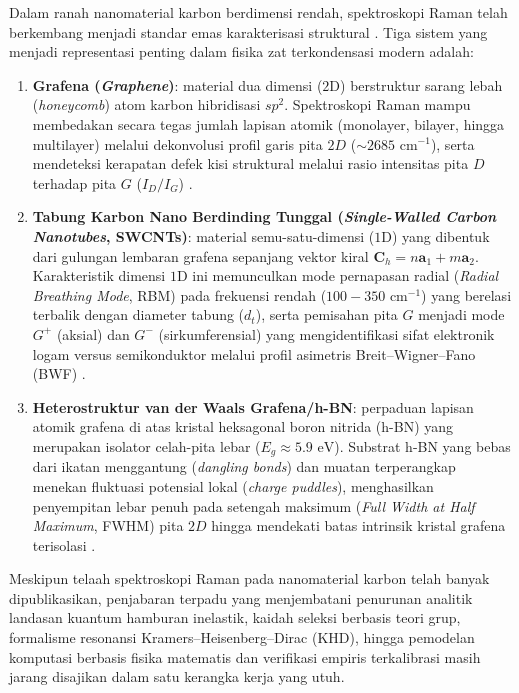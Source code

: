 Dalam ranah nanomaterial karbon berdimensi rendah, spektroskopi Raman telah berkembang menjadi standar emas karakterisasi struktural \cite{ferrari2006raman,dresselhaus2005raman,malard2009raman}. Tiga sistem yang menjadi representasi penting dalam fisika zat terkondensasi modern adalah:
\begin{enumerate}
    \item \textbf{Grafena (\textit{Graphene})}: material dua dimensi ($2\text{D}$) berstruktur sarang lebah (\textit{honeycomb}) atom karbon hibridisasi $sp^2$. Spektroskopi Raman mampu membedakan secara tegas jumlah lapisan atomik (monolayer, bilayer, hingga multilayer) melalui dekonvolusi profil garis pita $2D$ ($\sim 2685\text{ cm}^{-1}$), serta mendeteksi kerapatan defek kisi struktural melalui rasio intensitas pita $D$ terhadap pita $G$ ($I_D/I_G$) \cite{ferrari2006raman,cancado2011quantifying}.
    \item \textbf{Tabung Karbon Nano Berdinding Tunggal (\textit{Single-Walled Carbon Nanotubes}, SWCNTs)}: material semu-satu-dimensi ($1\text{D}$) yang dibentuk dari gulungan lembaran grafena sepanjang vektor kiral $\mathbf{C}_h = n\mathbf{a}_1 + m\mathbf{a}_2$. Karakteristik dimensi $1\text{D}$ ini memunculkan mode pernapasan radial (\textit{Radial Breathing Mode}, RBM) pada frekuensi rendah ($100 - 350\text{ cm}^{-1}$) yang berelasi terbalik dengan diameter tabung ($d_t$), serta pemisahan pita $G$ menjadi mode $G^+$ (aksial) dan $G^-$ (sirkumferensial) yang mengidentifikasi sifat elektronik logam versus semikonduktor melalui profil asimetris Breit--Wigner--Fano (BWF) \cite{dresselhaus2005raman}.
    \item \textbf{Heterostruktur van der Waals Grafena/h-BN}: perpaduan lapisan atomik grafena di atas kristal heksagonal boron nitrida (h-BN) yang merupakan isolator celah-pita lebar ($E_g \approx 5.9\text{ eV}$). Substrat h-BN yang bebas dari ikatan menggantung (\textit{dangling bonds}) dan muatan terperangkap menekan fluktuasi potensial lokal (\textit{charge puddles}), menghasilkan penyempitan lebar penuh pada setengah maksimum (\textit{Full Width at Half Maximum}, FWHM) pita $2D$ hingga mendekati batas intrinsik kristal grafena terisolasi \cite{dean2010boron,gorbachev2011hunting}.
\end{enumerate}

Meskipun telaah spektroskopi Raman pada nanomaterial karbon telah banyak dipublikasikan, penjabaran terpadu yang menjembatani penurunan analitik landasan kuantum hamburan inelastik, kaidah seleksi berbasis teori grup, formalisme resonansi Kramers--Heisenberg--Dirac (KHD), hingga pemodelan komputasi berbasis fisika matematis dan verifikasi empiris terkalibrasi masih jarang disajikan dalam satu kerangka kerja yang utuh.

